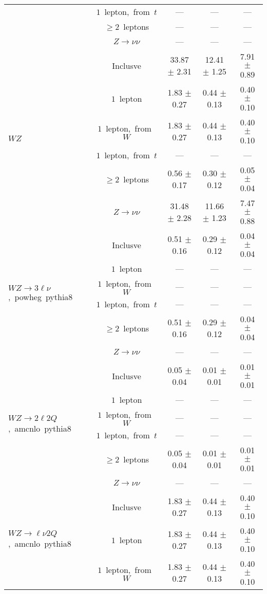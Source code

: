 \documentclass{article}
\begin{document}
\begin{longtable}{|l|c|c|c|c|}
 & $1$~lepton,~from~$t$  & ---  & ---  & --- \\* 
 & $\ge2$~leptons  & ---  & ---  & --- \\* 
 & $Z\rightarrow\nu\nu$  & ---  & ---  & --- \\* 
\hline 
\multirow{6}{*}{$WZ$} & Inclusve  & 33.87 $\pm$ 2.31  & 12.41 $\pm$ 1.25  & 7.91 $\pm$ 0.89 \\* 
 & $1$~lepton  & 1.83 $\pm$ 0.27  & 0.44 $\pm$ 0.13  & 0.40 $\pm$ 0.10 \\* 
 & $1$~lepton,~from~$W$  & 1.83 $\pm$ 0.27  & 0.44 $\pm$ 0.13  & 0.40 $\pm$ 0.10 \\* 
 & $1$~lepton,~from~$t$  & ---  & ---  & --- \\* 
 & $\ge2$~leptons  & 0.56 $\pm$ 0.17  & 0.30 $\pm$ 0.12  & 0.05 $\pm$ 0.04 \\* 
 & $Z\rightarrow\nu\nu$  & 31.48 $\pm$ 2.28  & 11.66 $\pm$ 1.23  & 7.47 $\pm$ 0.88 \\* 
\hline 
\multirow{6}{*}{$WZ{\rightarrow}3\ell\nu$,~powheg~pythia8} & Inclusve  & 0.51 $\pm$ 0.16  & 0.29 $\pm$ 0.12  & 0.04 $\pm$ 0.04 \\* 
 & $1$~lepton  & ---  & ---  & --- \\* 
 & $1$~lepton,~from~$W$  & ---  & ---  & --- \\* 
 & $1$~lepton,~from~$t$  & ---  & ---  & --- \\* 
 & $\ge2$~leptons  & 0.51 $\pm$ 0.16  & 0.29 $\pm$ 0.12  & 0.04 $\pm$ 0.04 \\* 
 & $Z\rightarrow\nu\nu$  & ---  & ---  & --- \\* 
\hline 
\multirow{6}{*}{$WZ{\rightarrow}2{\ell}2Q$,~amcnlo~pythia8} & Inclusve  & 0.05 $\pm$ 0.04  & 0.01 $\pm$ 0.01  & 0.01 $\pm$ 0.01 \\* 
 & $1$~lepton  & ---  & ---  & --- \\* 
 & $1$~lepton,~from~$W$  & ---  & ---  & --- \\* 
 & $1$~lepton,~from~$t$  & ---  & ---  & --- \\* 
 & $\ge2$~leptons  & 0.05 $\pm$ 0.04  & 0.01 $\pm$ 0.01  & 0.01 $\pm$ 0.01 \\* 
 & $Z\rightarrow\nu\nu$  & ---  & ---  & --- \\* 
\hline 
\multirow{6}{*}{$WZ{\rightarrow}{\ell}{\nu}2Q$,~amcnlo~pythia8} & Inclusve  & 1.83 $\pm$ 0.27  & 0.44 $\pm$ 0.13  & 0.40 $\pm$ 0.10 \\* 
 & $1$~lepton  & 1.83 $\pm$ 0.27  & 0.44 $\pm$ 0.13  & 0.40 $\pm$ 0.10 \\* 
 & $1$~lepton,~from~$W$  & 1.83 $\pm$ 0.27  & 0.44 $\pm$ 0.13  & 0.40 $\pm$ 0.10 \\* 

\end{longtable}
\end{document}
